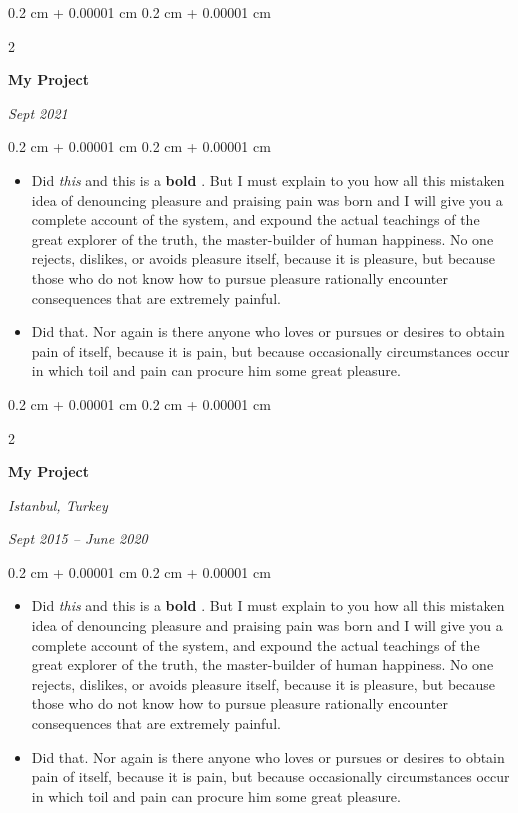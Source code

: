 \documentclass[10pt, letterpaper]{article}
\newenvironment{highlights}{
    \begin{itemize}[
        topsep=0.10 cm,
        parsep=0.10 cm,
        partopsep=0pt,
        itemsep=0pt,
        leftmargin=0.4 cm + 10pt
    ]
}{
    \end{itemize}
} %
\newenvironment{onecolentry}{
    \begin{adjustwidth}{
        0.2 cm + 0.00001 cm
    }{
        0.2 cm + 0.00001 cm
    }
}{
    \end{adjustwidth}
} %
\newenvironment{twocolentry}[2][]{
    \onecolentry
    \def\secondColumn{#2}
    \setcolumnwidth{\fill, 4.5 cm}
    \begin{paracol}{2}
}{
    \switchcolumn \raggedleft \secondColumn
    \end{paracol}
    \endonecolentry
} %
\let\hrefWithoutArrow\href
\renewcommand{\href}[2]{\hrefWithoutArrow{#1}{\ifthenelse{\equal{#2}{}}{ }{#2 }\raisebox{.15ex}{\footnotesize \faExternalLink*}}}
\begin{document}
        \vspace{0.2 cm}

        \begin{twocolentry}{
            
            
        \textit{Sept 2021}}
            \textbf{My Project}
        \end{twocolentry}

        \vspace{0.10 cm}
        \begin{onecolentry}
            \begin{highlights}
                \item Did \textit{this} and this is a \textbf{bold} \href{https://example.com}{link}. But I must explain to you how all this mistaken idea of denouncing pleasure and praising pain was born and I will give you a complete account of the system, and expound the actual teachings of the great explorer of the truth, the master-builder of human happiness. No one rejects, dislikes, or avoids pleasure itself, because it is pleasure, but because those who do not know how to pursue pleasure rationally encounter consequences that are extremely painful.
                \item Did that. Nor again is there anyone who loves or pursues or desires to obtain pain of itself, because it is pain, but because occasionally circumstances occur in which toil and pain can procure him some great pleasure.
            \end{highlights}
        \end{onecolentry}


        \vspace{0.2 cm}

        \begin{twocolentry}{
        \textit{Istanbul, Turkey}    
            
        \textit{Sept 2015 – June 2020}}
            \textbf{My Project}
        \end{twocolentry}

        \vspace{0.10 cm}
        \begin{onecolentry}
            \begin{highlights}
                \item Did \textit{this} and this is a \textbf{bold} \href{https://example.com}{link}. But I must explain to you how all this mistaken idea of denouncing pleasure and praising pain was born and I will give you a complete account of the system, and expound the actual teachings of the great explorer of the truth, the master-builder of human happiness. No one rejects, dislikes, or avoids pleasure itself, because it is pleasure, but because those who do not know how to pursue pleasure rationally encounter consequences that are extremely painful.
                \item Did that. Nor again is there anyone who loves or pursues or desires to obtain pain of itself, because it is pain, but because occasionally circumstances occur in which toil and pain can procure him some great pleasure.
            \end{highlights}
        \end{onecolentry}
\end{document}
